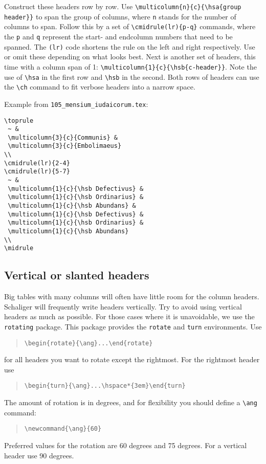 \documentclass{report}
\begin{document}
Construct these headers row by row.
Use \verb+\multicolumn{n}{c}{\hsa{group header}}+ to span the group of columns,
where \verb+n+ stands for the number of columns to span.
Follow this by a set of \verb+\cmidrule(lr){p-q}+ commands, where the
\verb+p+ and \verb+q+ represent the start- and endcolumn numbers
that need to be spanned. The \verb+(lr)+ code shortens the rule on the
left and right respectively. Use or omit these depending on what looks best.
Next is another set of headers, this time with a column span of 1:
\verb+\multicolumn{1}{c}{\hsb{c-header}}+.
Note the use of \verb+\hsa+ in the first row and \verb+\hsb+ in the second.
Both rows of headers can use the \verb+\ch+ command to fit verbose headers
into a narrow space.

Example from \verb+105_mensium_iudaicorum.tex+:
\begin{verbatim}
\toprule
 ~ &
 \multicolumn{3}{c}{Communis} &
 \multicolumn{3}{c}{Embolimaeus}
\\
\cmidrule(lr){2-4}
\cmidrule(lr){5-7} 
 ~ &
 \multicolumn{1}{c}{\hsb Defectivus} &
 \multicolumn{1}{c}{\hsb Ordinarius} &
 \multicolumn{1}{c}{\hsb Abundans} &
 \multicolumn{1}{c}{\hsb Defectivus} &
 \multicolumn{1}{c}{\hsb Ordinarius} &
 \multicolumn{1}{c}{\hsb Abundans}
\\
\midrule
\end{verbatim}

\subsection{Vertical or slanted headers}
Big tables with many columns will often have little room for the column headers.
Schaliger will frequently write headers vertically.
Try to avoid using vertical headers as much as possible.
For those cases where it is unavoidable, we use the \verb+rotating+ package.
This package provides the \verb+rotate+ and \verb+turn+ environments.
Use 
\begin{quote}
\verb+\begin{rotate}{\ang}...\end{rotate}+
\end{quote}
for all headers you want to rotate except the rightmost.
For the rightmost header use
\begin{quote}
\verb+\begin{turn}{\ang}...\hspace*{3em}\end{turn}+
\end{quote}
The amount of rotation is in degrees, and for flexibility you should define
a \verb+\ang+ command:
\begin{quote}
\verb+\newcommand{\ang}{60}+
\end{quote}
Preferred values for the rotation are 60 degrees and 75 degrees.
For a vertical header use 90 degrees.
\end{document}
